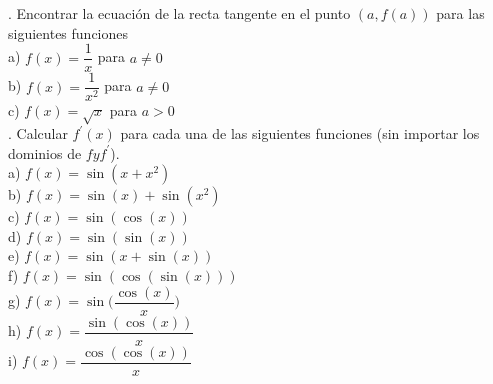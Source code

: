 \documentclass[letterpaper]{article}
\newcommand{\fp}[1]{#1^{\prime}}
\begin{document}

. Encontrar la ecuación de la recta tangente en el punto $ (a, f (a)) $ para las siguientes funciones\\

a) $ f(x) = \dfrac{1}{x} $ para $ a\neq 0 $\\


b) $ f(x) = \dfrac{1}{x^{2}} $ para $ a\neq 0 $\\


c) $ f(x) = \sqrt{x} $ para $ a > 0 $\\


. Calcular $ \fp{f}(x) $ para cada una de las siguientes funciones (sin importar los dominios de $ f y \fp{f} $).\\

a) $ f(x) = \sin(x + x^{2}) $\\


b) $ f(x) = \sin(x)+\sin(x^{2}) $\\


c) $ f(x) = \sin(\cos(x)) $\\


d) $ f(x) = \sin(\sin(x)) $\\


e) $ f(x) = \sin(x + \sin(x)) $\\


f) $ f(x) = \sin(\cos(\sin(x))) $\\


g) $ f(x) = \sin\Big(\dfrac{\cos(x)}{x}\Big) $\\


h) $ f(x) = \dfrac{\sin(\cos(x))}{x} $\\


i) $ f(x) = \dfrac{\cos(\cos(x))}{x} $\\

\end{document}

